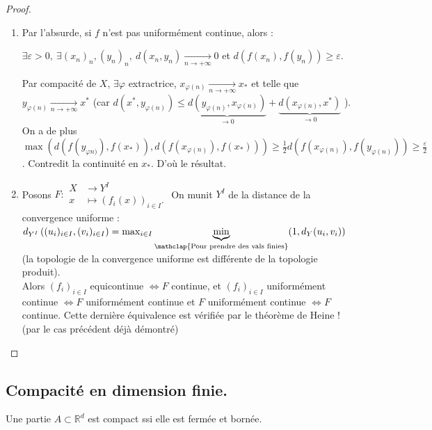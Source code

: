 \begin{proof}
    \begin{enumerate}
        \item Par l'absurde, si $f$ n'est pas uniformément continue, alors :
        
        $\exists \varepsilon >0,\ \exists (x_n)_n,(y_n)_n,\ d(x_n,y_n)\underset{n\to +\infty}{\longrightarrow} 0$ et $d(f(x_{n}),f(y_n))\ge \varepsilon$.
        
        Par compacité de $X$, $\exists \varphi $ extractrice, $x_{\varphi (n)}\underset{n\to +\infty}{\longrightarrow} x_*$ et telle que $y_{\varphi(n)} \underset{n\to +\infty}{\longrightarrow} x^*$ 
        (car $d(x^*,y_{\varphi(n)}) \leq \underbrace{d(y_{\varphi(n)},x_{\varphi(n)})}_{\longrightarrow 0} + \underbrace{d(x_{\varphi(n)},x^*)}_{\longrightarrow 0}$ ).
        On a de plus $\max(d(f(y_{\varphi n)}),f(x_*)),d(f(x_{\varphi(n)}),f(x_*)))\ge \frac{1}{2}d(f(x_{\varphi (n)}),f(y_{\varphi (n)}))\ge \frac{\varepsilon}{2}$. Contredit la continuité en $x_*$. 
        D'où le résultat.
        
        \item Posons $F :\begin{aligned}
            X &\longrightarrow Y^I \\
            x &\longmapsto \left(f_i(x)\right)_{i\in I}.
        \end{aligned}$ On munit $Y^I$ de la distance de la convergence uniforme : $d_{Y^I}\left( (u_i)_{i\in I}, (v_i)_{i\in I} \right) =\max_{i\in I}\underbrace{\min}_{\mathclap{\text{Pour prendre des vals finies}}}(1,d_Y(u_i,v_i))$ (la topologie de la convergence uniforme est différente de la topologie produit). \\
        Alors $(f_i)_{i \in I}$ equicontinue $\Leftrightarrow F$ continue, et $\left( f_i \right)_{i\in I} $ uniformément continue $\Leftrightarrow F$ uniformément continue et $F$ uniformément continue $\Leftrightarrow F$ continue. Cette dernière équivalence est vérifiée par le théorème de Heine ! (par le cas précédent déjà démontré)
    \end{enumerate}
\end{proof}

\subsection{Compacité en dimension finie.}
\begin{propriete}
    Une partie $A\subset \mathbb{R} ^d$ est compact ssi elle est fermée et bornée.
\end{propriete}

